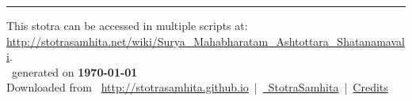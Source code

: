 \documentclass[oneside,12pt]{book}
\begin{document}
\setmainfont[Script=Devanagari,Mapping=tex-text]{Sanskrit 2003}
\fontsize {16}{19.25}\selectfont
\begin{center}

\end{center}
\vfill
\centering
\rule{0.8\textwidth}{0.6pt}

\footnotesize
{}\sffamily
This stotra can be accessed in multiple scripts at:\\
\url{http://stotrasamhita.net/wiki/Surya_Mahabharatam_Ashtottara_Shatanamavali}.\\[1ex]
\faFilePdfO~generated on \textbf{\today}\\[1ex]
Downloaded from \faGlobe{}~\url{http://stotrasamhita.github.io}~|~\href{https://github.com/StotraSamhita}{\faGithubSquare{}~StotraSamhita}~|~\href{https://stotrasamhita.github.io/about/}{Credits}
\end{document}

